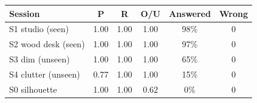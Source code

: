 \begin{tabular}{@{}lccccc@{}}
\toprule
Session & P & R & O/U & Answered & Wrong \\
\midrule
S1 studio (seen) & 1.00 & 1.00 & 1.00 & 98\% & 0 \\
S2 wood desk (seen) & 1.00 & 1.00 & 1.00 & 97\% & 0 \\
S3 dim (unseen) & 1.00 & 1.00 & 1.00 & 65\% & 0 \\
S4 clutter (unseen) & 0.77 & 1.00 & 1.00 & 15\% & 0 \\
S0 silhouette & 1.00 & 1.00 & 0.62 & 0\% & 0 \\
\bottomrule
\end{tabular}
